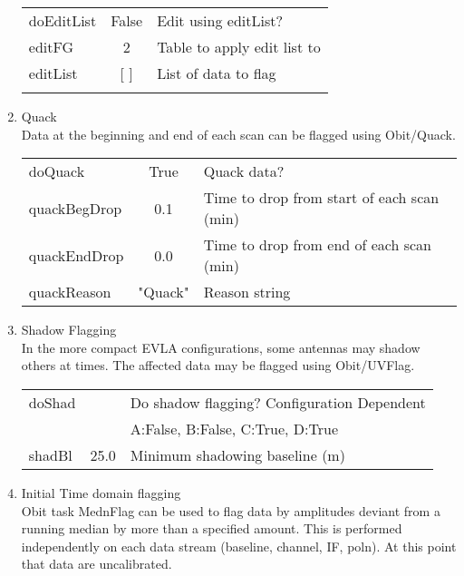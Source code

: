 \documentclass[11pt]{article}
\begin{document}
\begin{enumerate}
\begin{center}
\begin{tabular}{|l|c|l|}
\hline
doEditList  & False & Edit using editList? \\
editFG      & 2     & Table to apply edit list to\\
 editList   & [ ]   & List of data to flag \\
  &  &  \\
\hline
\end{tabular}
\end{center}
%
\item Quack\\
Data at the beginning and end of each scan can be flagged using
Obit/Quack. 
\begin{center}
\begin{tabular}{|l|c|l|}
\hline
doQuack       & True    & Quack data? \\
quackBegDrop  & 0.1     & Time to drop from start of each scan (min) \\
quackEndDrop  & 0.0     & Time to drop from end of each scan (min) \\
quackReason   & "Quack" & Reason string \\
\hline
\end{tabular}
\end{center}
%
\item Shadow Flagging \\
In the more compact EVLA configurations, some antennas may shadow
others at times.
The affected data may be flagged using Obit/UVFlag.
\begin{center}
\begin{tabular}{|l|c|l|}
\hline
doShad  &      & Do shadow flagging? Configuration Dependent \\
        &      & A:False, B:False, C:True, D:True\\
shadBl  & 25.0 &  Minimum shadowing baseline (m)\\
\hline
\end{tabular}
\end{center}
%
\item Initial Time domain flagging\\
Obit task MednFlag can be used to flag data by amplitudes deviant from
a running median by more than a specified amount.
This is performed independently on each data stream (baseline,
channel, IF, poln).
At this point that data are uncalibrated.
\begin{center}
\begin{tabular}{|l|c|l|}

\end{tabular}
\end{center}
\end{enumerate}
\end{document}
